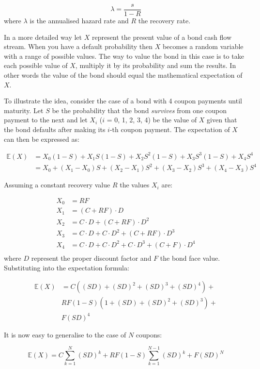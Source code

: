 \[\lambda = \frac{s}{1-R}\]
where $\lambda$ is the annualised hazard rate and $R$ the recovery rate.

In a more detailed way let $X$ represent the present value of a bond cash flow stream. When you
have a default probability then $X$ becomes a random variable with a range
of possible values. The way
to value the bond in this case is to take each possible value of $X$, multiply it
by its probability and sum the results. In other words the value of the bond
should equal the mathematical expectation of $X$.

To illustrate the idea, consider the case of a bond with 4 coupon payments
until maturity. Let $S$ be the probability that the bond \emph{survives} from one
coupon payment to the next and let $X_i$ ($i$ = 0, 1, 2, 3, 4) be the value of
$X$ given that the bond defaults after making its $i$-th coupon payment. 
The expectation of $X$ can then be expressed as:

\begin{align*}
\mathbb{E}(X) &= X_0(1-S) + X_1 S(1-S) + X_2 S^2 (1-S) + X_3 S^3 (1-S) + X_4 S^4 \\
&= X_0 + (X_1 - X_0)S + (X_2 - X_1)S^2 + (X_3 - X_2)S^3 + (X_4 - X_3)S^4
\end{align*}

Assuming a constant recovery value $R$ the values $X_i$ are:

\begin{align*}
X_0 &= RF \\
X_1 &= (C + RF)\cdot D \\
X_2 &= C\cdot D + (C + RF)\cdot D^2 \\
X_3 &= C\cdot D + C\cdot D^2 + (C + RF)\cdot D^3 \\
X_4 &= C\cdot D + C\cdot D^2 + C\cdot D^3 + (C + F)\cdot D^4 \\
\end{align*}
where $D$ represent the proper discount factor and $F$ the bond face value.
Substituting into the expectation formula:

\begin{align*}
\mathbb{E}(X) &= C((SD) + (SD)^2 + (SD)^3 + (SD)^4) + \\
&RF(1-S)(1+(SD)+(SD)^2 + (SD)^3) + \\
&F(SD)^4 
\end{align*}

It is now easy to generalise to the case of $N$ coupons:

\[ \mathbb{E}(X) = C \sum_{k=1}^{N}{(SD)^k} + RF(1-S)\sum_{k=1}^{N-1}{(SD)^k} + F(SD)^N \]

